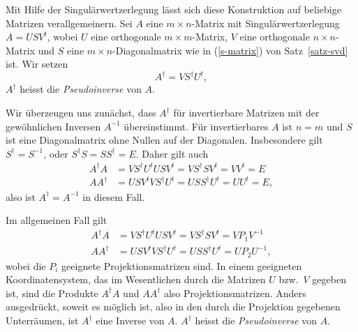 Mit Hilfe der Singulärwertzerlegung lässt sich diese Konstruktion
auf beliebige Matrizen verallgemeinern.
Sei $A$ eine $m\times n$-Matrix mit Singulärwertzerlegung
$A=USV^t$, wobei $U$ eine orthogonale $m\times m$-Matrix, $V$ eine orthogonale
$n\times n$-Matrix und $S$ eine $m\times n$-Diagonalmatrix wie in (\ref{s-matrix})
von Satz~\ref{satz-svd} ist.
Wir setzen
\begin{equation}
A^\dagger = VS^\dagger U^t,
\label{definition-pseudoinverse}
\end{equation}
$A^\dagger$ heisst die {\em Pseudoinverse} von $A$.

Wir überzeugen uns zunächst, dass $A^\dagger$ für invertierbare Matrizen
mit der gewöhnlichen Inversen $A^{-1}$ übereinstimmt.
Für invertierbares $A$ ist $n=m$ und $S$ ist eine Diagonalmatrix ohne Nullen
auf der Diagonalen.
Insbesondere gilt $S^\dagger=S^{-1}$, oder $S^\dagger S=SS^\dagger=E$.
Daher gilt auch
\begin{align*}
A^\dagger A&=VS^\dagger U^tUSV^t=VS^\dagger SV^t=VV^t=E\\
AA^\dagger &=USV^tVS^\dagger U^t=USS^\dagger U^t=UU^t=E,
\end{align*}
also ist $A^\dagger=A^{-1}$ in diesem Fall.

Im allgemeinen Fall gilt
\begin{align*}
A^\dagger A&=VS^\dagger U^tUSV^t=VS^\dagger SV^t=VP_1V^{-1}\\
AA^\dagger &=USV^tVS^\dagger U^t=USS^\dagger U^t=UP_2U^{-1},
\end{align*}
wobei die $P_i$ geeignete Projektionsmatrizen sind.
In einem geeigneten Koordinatensystem, das im Wesentlichen durch die Matrizen
$U$ bzw.~$V$ gegeben ist, sind die Produkte $A^\dagger A$ und $AA^\dagger$
also Projektionsmatrizen.
Anders ausgedrückt, soweit es möglich ist, also in den durch die Projektion
gegebenen Unterräumen, ist $A^\dagger$ eine Inverse von $A$.
$A^\dagger$ heisst die {\em Pseudoinverse} von $A$.

